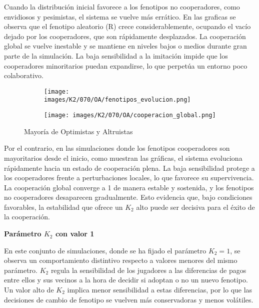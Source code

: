 \documentclass[a4paper,12pt]{report}
\begin{document}
\newpage

Cuando la distribución inicial favorece a los fenotipos no cooperadores, como envidiosos y pesimistas, el sistema se vuelve más errático. En las graficas se observa que el fenotipo aleatorio (R) crece considerablemente, ocupando el vacío dejado por los cooperadores, que son rápidamente desplazados. La cooperación global se vuelve inestable y se mantiene en niveles bajos o medios durante gran parte de la simulación. La baja sensibilidad a la imitación impide que los cooperadores minoritarios puedan expandirse, lo que perpetúa un entorno poco colaborativo.


\begin{figure}[h]
    \centering
    \begin{subfigure}[t]{0.49\textwidth}
        \centering
        \texttt{[image: images/K2/070/OA/fenotipos\_evolucion.png]}
        \label{fig:enter-label}
    \end{subfigure}
    \hfill
    \begin{subfigure}[t]{0.49\textwidth}
        \centering
        \texttt{[image: images/K2/070/OA/cooperacion\_global.png]}
        \label{fig:enter-label}
    \end{subfigure}
    \caption{Mayoría de Optimistas y Altruistas}
\end{figure}

Por el contrario, en las simulaciones donde los fenotipos cooperadores son mayoritarios desde el inicio, como muestran las gráficas, el sistema evoluciona rápidamente hacia un estado de cooperación plena. La baja sensibilidad protege a los cooperadores frente a perturbaciones locales, lo que favorece su supervivencia. La cooperación global converge a 1 de manera estable y sostenida, y los fenotipos no cooperadores desaparecen gradualmente. Esto evidencia que, bajo condiciones favorables, la estabilidad que ofrece un \( K_2 \) alto puede ser decisiva para el éxito de la cooperación.


\newpage

\vspace{1.5em}
\noindent\textbf{Parámetro \( K_2 \) con valor 1}
\vspace{0.5em}

En este conjunto de simulaciones, donde se ha fijado el parámetro \( K_2 = 1 \), se observa un comportamiento distintivo respecto a valores menores del mismo parámetro. \( K_2 \) regula la sensibilidad de los jugadores a las diferencias de pagos entre ellos y sus vecinos a la hora de decidir si adoptan o no un nuevo fenotipo. Un valor alto de \( K_2 \) implica menor sensibilidad a estas diferencias, por lo que las decisiones de cambio de fenotipo se vuelven más conservadoras y menos volátiles.
\end{document}
